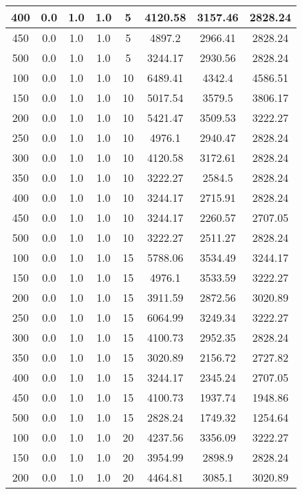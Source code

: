 \documentclass[a4paper, 12pt]{extreport}
\begin{document}
\begin{itemize}
\begin{longtable}{|c|c|c|c|c|c|c|c|}
			400 & 0.0 & 1.0 & 1.0 & 5 & 4120.58 & 3157.46 & 2828.24 \\\hline
			450 & 0.0 & 1.0 & 1.0 & 5 & 4897.2 & 2966.41 & 2828.24 \\\hline
			500 & 0.0 & 1.0 & 1.0 & 5 & 3244.17 & 2930.56 & 2828.24 \\\hline
			100 & 0.0 & 1.0 & 1.0 & 10 & 6489.41 & 4342.4 & 4586.51 \\\hline
			150 & 0.0 & 1.0 & 1.0 & 10 & 5017.54 & 3579.5 & 3806.17 \\\hline
			200 & 0.0 & 1.0 & 1.0 & 10 & 5421.47 & 3509.53 & 3222.27 \\\hline
			250 & 0.0 & 1.0 & 1.0 & 10 & 4976.1 & 2940.47 & 2828.24 \\\hline
			300 & 0.0 & 1.0 & 1.0 & 10 & 4120.58 & 3172.61 & 2828.24 \\\hline
			350 & 0.0 & 1.0 & 1.0 & 10 & 3222.27 & 2584.5 & 2828.24 \\\hline
			400 & 0.0 & 1.0 & 1.0 & 10 & 3244.17 & 2715.91 & 2828.24 \\\hline
			450 & 0.0 & 1.0 & 1.0 & 10 & 3244.17 & 2260.57 & 2707.05 \\\hline
			500 & 0.0 & 1.0 & 1.0 & 10 & 3222.27 & 2511.27 & 2828.24 \\\hline
			100 & 0.0 & 1.0 & 1.0 & 15 & 5788.06 & 3534.49 & 3244.17 \\\hline
			150 & 0.0 & 1.0 & 1.0 & 15 & 4976.1 & 3533.59 & 3222.27 \\\hline
			200 & 0.0 & 1.0 & 1.0 & 15 & 3911.59 & 2872.56 & 3020.89 \\\hline
			250 & 0.0 & 1.0 & 1.0 & 15 & 6064.99 & 3249.34 & 3222.27 \\\hline
			300 & 0.0 & 1.0 & 1.0 & 15 & 4100.73 & 2952.35 & 2828.24 \\\hline
			350 & 0.0 & 1.0 & 1.0 & 15 & 3020.89 & 2156.72 & 2727.82 \\\hline
			400 & 0.0 & 1.0 & 1.0 & 15 & 3244.17 & 2345.24 & 2707.05 \\\hline
			450 & 0.0 & 1.0 & 1.0 & 15 & 4100.73 & 1937.74 & 1948.86 \\\hline
			500 & 0.0 & 1.0 & 1.0 & 15 & 2828.24 & 1749.32 & 1254.64 \\\hline
			100 & 0.0 & 1.0 & 1.0 & 20 & 4237.56 & 3356.09 & 3222.27 \\\hline
			150 & 0.0 & 1.0 & 1.0 & 20 & 3954.99 & 2898.9 & 2828.24 \\\hline
			200 & 0.0 & 1.0 & 1.0 & 20 & 4464.81 & 3085.1 & 3020.89 \\\hline

\end{longtable}
\end{itemize}
\end{document}
